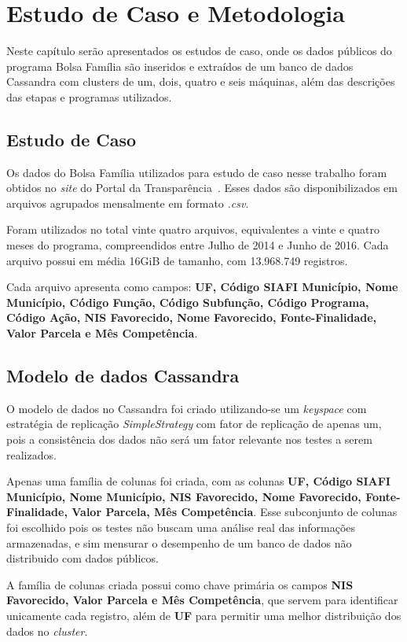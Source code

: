 

\chapter{Estudo de Caso e Metodologia}

Neste capítulo serão apresentados os estudos de caso, onde os dados públicos do programa Bolsa Família são inseridos e extraídos de um banco de dados Cassandra com clusters de um, dois, quatro e seis máquinas, além das descrições das etapas e programas utilizados.

\section{Estudo de Caso}
Os dados do Bolsa Família utilizados para estudo de caso nesse trabalho foram obtidos no \emph{site} do Portal da Transparência~\cite{portaldatransparencia}. Esses dados são disponibilizados em arquivos agrupados mensalmente em formato \emph{.csv}. 

Foram utilizados no total vinte quatro arquivos, equivalentes a vinte e quatro meses do programa, compreendidos entre Julho de 2014 e Junho de 2016. Cada arquivo possui em média 16GiB de tamanho, com 13.968.749 registros.

Cada arquivo apresenta como campos: \textbf{UF, Código SIAFI Município, Nome Município, Código Função, Código Subfunção, Código Programa, Código Ação, NIS Favorecido, Nome Favorecido, Fonte-Finalidade, Valor Parcela e Mês Competência}. 


\section{Modelo de dados Cassandra}
O modelo de dados no Cassandra foi criado utilizando-se um \emph{keyspace} com estratégia de replicação \emph{SimpleStrategy} com fator de replicação de apenas um, pois a consistência dos dados não será um fator relevante nos testes a serem realizados.

Apenas uma família de colunas foi criada, com as colunas \textbf{UF, Código SIAFI Município, Nome Município, NIS Favorecido, Nome Favorecido, Fonte-Finalidade, Valor Parcela, Mês Competência}. Esse subconjunto de colunas foi escolhido pois os testes não buscam uma análise real das informações armazenadas, e sim mensurar o desempenho de um banco de dados não distribuido com dados públicos.

A família de colunas criada possui como chave primária os campos \textbf{NIS Favorecido, Valor Parcela e Mês Competência}, que servem para identificar unicamente cada registro, além de \textbf{UF} para permitir uma melhor distribuição dos dados no \emph{cluster}.

